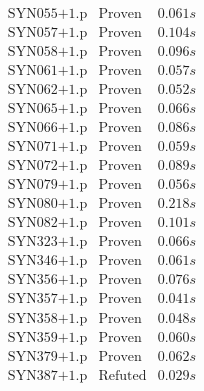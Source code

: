 \documentclass[a4paper,11pt]{report}
\theoremstyle{definition}
\theoremstyle{definition}
\theoremstyle{definition}
\theoremstyle{definition}
\theoremstyle{definition}
\theoremstyle{definition}
\theoremstyle{definition}
\begin{document}
\begin{minipage}{0.45\textwidth}
\[\begin{matrix}
			\text{SYN055+1.p}&\text{Proven}& 0.061 s\\
			\text{SYN057+1.p}&\text{Proven}& 0.104 s\\
			\text{SYN058+1.p}&\text{Proven}& 0.096 s\\
			\text{SYN061+1.p}&\text{Proven}& 0.057 s\\
			\text{SYN062+1.p}&\text{Proven}& 0.052 s\\
			\text{SYN065+1.p}&\text{Proven}& 0.066 s\\
			\text{SYN066+1.p}&\text{Proven}& 0.086 s\\
			\text{SYN071+1.p}&\text{Proven}& 0.059 s\\
			\text{SYN072+1.p}&\text{Proven}& 0.089 s\\
			\text{SYN079+1.p}&\text{Proven}& 0.056 s\\
			\text{SYN080+1.p}&\text{Proven}& 0.218 s\\
			\text{SYN082+1.p}&\text{Proven}& 0.101 s\\
			\text{SYN323+1.p}&\text{Proven}& 0.066 s\\
			\text{SYN346+1.p}&\text{Proven}& 0.061 s\\
			\text{SYN356+1.p}&\text{Proven}& 0.076 s\\
			\text{SYN357+1.p}&\text{Proven}& 0.041 s\\
			\text{SYN358+1.p}&\text{Proven}& 0.048 s\\
			\text{SYN359+1.p}&\text{Proven}& 0.060 s\\
			\text{SYN379+1.p}&\text{Proven}& 0.062 s\\
			\text{SYN387+1.p}&\text{Refuted}& 0.029 s\\
		\end{matrix}\]
	\end{minipage}
\end{document}
